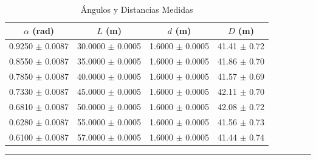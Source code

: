 \documentclass[10pt,a4paper]{article}
\begin{document}
	\begin{table}[H]
		\centering
		\begin{tabular}{|c|c|c|c|}
			\hline
			$\alpha$ (rad) & $L$ (m) & $d$ (m)&  $D$ (m) \\ \hline
			0.9250 $\pm$ 0.0087  & 30.0000 $\pm$ 0.0005 &  1.6000 $\pm$ 0.0005 & 41.41 $\pm$ 0.72\\
			0.8550 $\pm$ 0.0087  & 35.0000 $\pm$ 0.0005 &  1.6000 $\pm$ 0.0005 & 41.86 $\pm$ 0.70\\
			0.7850 $\pm$ 0.0087  & 40.0000 $\pm$ 0.0005 &  1.6000 $\pm$ 0.0005 & 41.57 $\pm$ 0.69\\ 
			0.7330 $\pm$ 0.0087 & 45.0000 $\pm$ 0.0005 & 1.6000 $\pm$ 0.0005 & 42.11 $\pm$ 0.70\\ 
			0.6810 $\pm$ 0.0087 & 50.0000 $\pm$ 0.0005 & 1.6000 $\pm$ 0.0005 &  42.08 $\pm$ 0.72\\ 
			0.6280 $\pm$ 0.0087 & 55.0000 $\pm$ 0.0005 & 1.6000 $\pm$ 0.0005 & 41.56 $\pm$ 0.73\\
			0.6100 $\pm$ 0.0087  & 57.0000 $\pm$ 0.0005 &  1.6000 $\pm$ 0.0005 & 41.44 $\pm$ 0.74\\ \hline
		\end{tabular}
		\caption{Ángulos y Distancias Medidas}
		\label{tab:angulos_distancias.}
		\rule{100mm}{0.1mm}
	\end{table}
\end{document}
